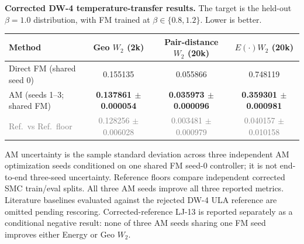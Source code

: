 \documentclass[10pt]{article}
\begin{document}
\small
\textbf{Corrected DW-4 temperature-transfer results.}
The target is the held-out $\beta=1.0$ distribution, with FM trained at
$\beta\in\{0.8,1.2\}$. Lower is better.

\vspace{0.9em}
\begin{center}
\begin{tabular}{lccc}
\toprule
Method &
Geo $W_2$ (2k) &
Pair-distance $W_2$ (20k) &
$E(\cdot)W_2$ (20k) \\
\midrule
Direct FM (shared seed 0) &
0.155135 & 0.055866 & 0.748119 \\
AM (seeds 1--3; shared FM) &
\textbf{0.137861 $\pm$ 0.000054} &
\textbf{0.035973 $\pm$ 0.000096} &
\textbf{0.359301 $\pm$ 0.000981} \\
\addlinespace
\textcolor{gray}{Ref.\ vs Ref.\ floor} &
\textcolor{gray}{0.128256 $\pm$ 0.006028} &
\textcolor{gray}{0.003481 $\pm$ 0.000979} &
\textcolor{gray}{0.040157 $\pm$ 0.010158} \\
\bottomrule
\end{tabular}
\end{center}

\vspace{0.45em}
\footnotesize
AM uncertainty is the sample standard deviation across three independent AM
optimization seeds conditioned on one shared FM seed-0 controller; it is not
end-to-end three-seed uncertainty. Reference floors compare independent
corrected SMC train/eval splits. All three AM seeds improve all three reported
metrics. Literature baselines evaluated against the rejected DW-4 ULA
reference are omitted pending rescoring. Corrected-reference LJ-13 is reported
separately as a conditional negative result: none of three AM seeds sharing
one FM seed improves either Energy or Geo $W_2$.
\end{document}
